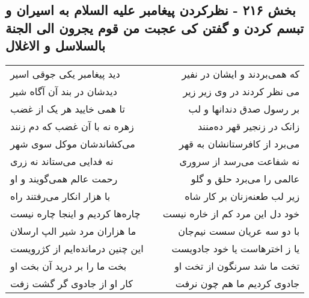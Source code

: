 \begin{center}
\section*{بخش ۲۱۶ - نظرکردن پیغامبر علیه السلام به اسیران و تبسم کردن و گفتن کی عجبت من قوم یجرون الی الجنة بالسلاسل و الاغلال}
\label{sec:sh216}
\begin{longtable}{l p{0.5cm} r}
دید پیغامبر یکی جوقی اسیر
&&
که همی‌بردند و ایشان در نفیر
\\
دیدشان در بند آن آگاه شیر
&&
می نظر کردند در وی زیر زیر
\\
تا همی خایید هر یک از غضب
&&
بر رسول صدق دندانها و لب
\\
زهره نه با آن غضب که دم زنند
&&
زانک در زنجیر قهر ده‌منند
\\
می‌کشاندشان موکل سوی شهر
&&
می‌برد از کافرستانشان به قهر
\\
نه فدایی می‌ستاند نه زری
&&
نه شفاعت می‌رسد از سروری
\\
رحمت عالم همی‌گویند و او
&&
عالمی را می‌برد حلق و گلو
\\
با هزار انکار می‌رفتند راه
&&
زیر لب طعنه‌زنان بر کار شاه
\\
چاره‌ها کردیم و اینجا چاره نیست
&&
خود دل این مرد کم از خاره نیست
\\
ما هزاران مرد شیر الپ ارسلان
&&
با دو سه عریان سست نیم‌جان
\\
این چنین درمانده‌ایم از کژرویست
&&
یا ز اخترهاست یا خود جادویست
\\
بخت ما را بر درید آن بخت او
&&
تخت ما شد سرنگون از تخت او
\\
کار او از جادوی گر گشت زفت
&&
جادوی کردیم ما هم چون نرفت
\\
\end{longtable}
\end{center}
